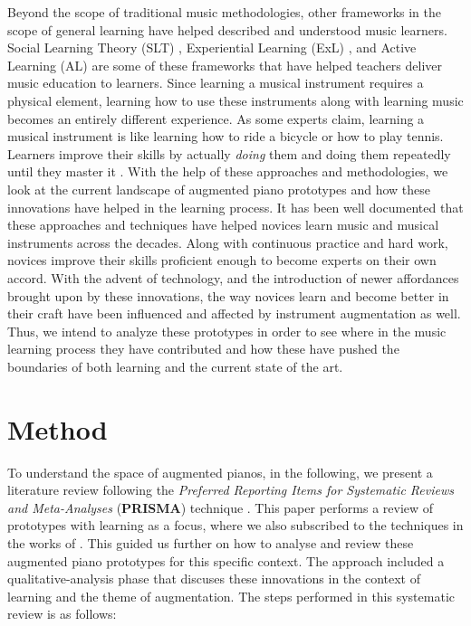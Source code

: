 \documentclass[sigconf, screen, review]{acmart}
\let\xtodo\todo
\renewcommand{\todo}[1]{\xtodo[inline]{#1}}
\newcommand{\todok}[1]{\xtodo[inline,color=green!50]{M and K: #1}}
\begin{document}
Beyond the scope of traditional music methodologies, other frameworks in the scope of general learning have helped described and understood music learners. Social Learning Theory (SLT) \cite{waldron2009exploring, gordon2011roots}, Experiential Learning (ExL) \cite{webster2011construction, russell2013mission}, and Active Learning (AL) \cite{scott2011contemplating, michael2003active} are some of these frameworks that have helped teachers deliver music education to learners. Since learning a musical instrument requires a physical element, learning how to use these instruments along with learning music becomes an entirely different experience. As some experts claim, learning a musical instrument is like learning how to ride a bicycle or how to play tennis. Learners improve their skills by actually \textit{doing} them and doing them repeatedly until they master it \cite{stryker1997content}. With the help of these approaches and methodologies, we look at the current landscape of augmented piano prototypes and how these innovations have helped in the learning process. It has been well documented that these approaches and techniques have helped novices learn music and musical instruments across the decades. Along with continuous practice and hard work, novices improve their skills proficient enough to become experts on their own accord. With the advent of technology, and the introduction of newer affordances brought upon by these innovations, the way novices learn and become better in their craft have been influenced and affected by instrument augmentation as well. Thus, we intend to analyze these prototypes in order to see where in the music learning process they have contributed and how these have pushed the boundaries of both learning and the current state of the art. 
\todok{Please give feedback. Thank you!}
\section{Method}
To understand the space of augmented pianos, in the following, we present a literature review following the \textit{Preferred Reporting Items for Systematic Reviews and Meta-Analyses} (\textbf{PRISMA}) technique \cite{moher2009preferred}. This paper performs a review of prototypes with learning as a focus, where we also subscribed to the techniques in the works of \cite{santos2013augmented, schneegass2016mobile, kljun2015transference, blattgerste2019augmented, mcpherson2015buttons, delgado2011state}. This guided us further on how to analyse and review these augmented piano prototypes for this specific context. The approach included a qualitative-analysis phase that discuses these innovations in the context of learning and the theme of augmentation. The steps performed in this systematic review is as follows: 
\end{document}
